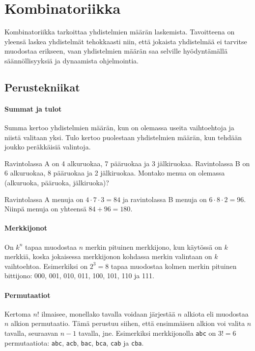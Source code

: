 \chapter{Kombinatoriikka}

Kombinatoriikka tarkoittaa yhdistelmien määrän laskemista.
Tavoitteena on yleensä laskea yhdistelmät
tehokkaasti niin, että jokaista yhdistelmää
ei tarvitse muodostaa erikseen, vaan yhdistelmien määrän
saa selville hyödyntämällä säännöllisyyksiä ja
dynaamista ohjelmointia.

\section{Perustekniikat}

\subsubsection{Summat ja tulot}

Summa kertoo yhdistelmien määrän,
kun on olemassa useita vaihtoehtoja
ja niistä valitaan yksi.
Tulo kertoo puolestaan yhdistelmien määrän,
kun tehdään joukko peräkkäisiä valintoja.

\begin{task}
Ravintolassa A on 4 alkuruokaa,
7 pääruokaa ja 3 jälkiruokaa.
Ravintolassa B on 6 alkuruokaa,
8 pääruokaa ja 2 jälkiruokaa.
Montako menua on olemassa (alkuruoka, pääruoka, jälkiruoka)?
\end{task}

Ravintolassa A menuja on $4 \cdot 7 \cdot 3 = 84$
ja ravintolassa B menuja on $6 \cdot 8 \cdot 2 = 96$.
Niinpä menuja on yhteensä $84+96=180$.

\subsubsection{Merkkijonot}

On $k^n$ tapaa muodostaa $n$ merkin pituinen merkkijono,
kun käytössä on $k$ merkkiä,
koska jokaisessa merkkijonon kohdassa merkin valintaan
on $k$ vaihtoehtoa.
Esimerkiksi on $2^3=8$ tapaa muodostaa kolmen merkin pituinen
bittijono:
000, 001, 010, 011, 100, 101, 110 ja 111.

\subsubsection{Permutaatiot}

Kertoma $n!$ ilmaisee, monellako tavalla voidaan
järjestää $n$ alkiota
eli muodostaa $n$ alkion permutaatio.
Tämä perustuu siihen, että ensimmäisen
alkion voi valita $n$ tavalla,
seuraavan $n-1$ tavalla, jne.
Esimerkiksi merkkijonolla \texttt{abc} on
$3!=6$ permutaatiota:
\texttt{abc},
\texttt{acb},
\texttt{bac},
\texttt{bca},
\texttt{cab} ja
\texttt{cba}.

